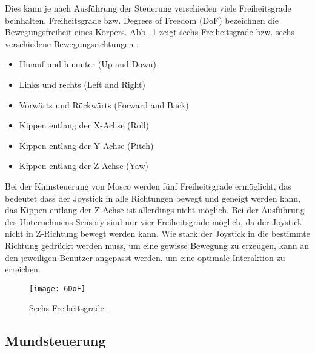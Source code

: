 \newline
Dies kann je nach Ausführung der Steuerung verschieden viele Freiheitsgrade beinhalten. Freiheitsgrade bzw. Degrees of Freedom (DoF) bezeichnen die Bewegungsfreiheit eines Körpers.
\newline \newline
Abb.~\ref{fig:6DoF} zeigt sechs Freiheitsgrade bzw. sechs verschiedene Bewegungsrichtungen \cite{6DoF}:
\begin{itemize}
      \item Hinauf und hinunter (Up and Down)
      \item Links und rechts (Left and Right)
			\item Vorwärts und Rückwärts (Forward and Back)
			\item Kippen entlang der X-Achse (Roll)
      \item Kippen entlang der Y-Achse (Pitch)
			\item Kippen entlang der Z-Achse (Yaw)
\end{itemize}
%
\vspace{\baselineskip}
Bei der Kinnsteuerung von Mosco werden fünf Freiheitsgrade ermöglicht, das bedeutet dass der Joystick in alle Richtungen bewegt und geneigt werden kann, das Kippen entlang der Z-Achse ist allerdings nicht möglich. Bei der Ausführung des Unternehmens Sensory sind nur vier Freiheitsgrade möglich, da der Joystick nicht in Z-Richtung bewegt werden kann. 
Wie stark der Joystick in die bestimmte Richtung gedrückt werden muss, um eine gewisse Bewegung zu erzeugen, kann an den jeweiligen Benutzer angepasst werden, um eine optimale Interaktion zu erreichen.
%
\begin{figure}
\centering
\texttt{[image: 6DoF]}
\caption{Sechs Freiheitsgrade \cite{6DoFPic}.}
\label{fig:6DoF}
\end{figure}
%
%

\subsection{Mundsteuerung}

